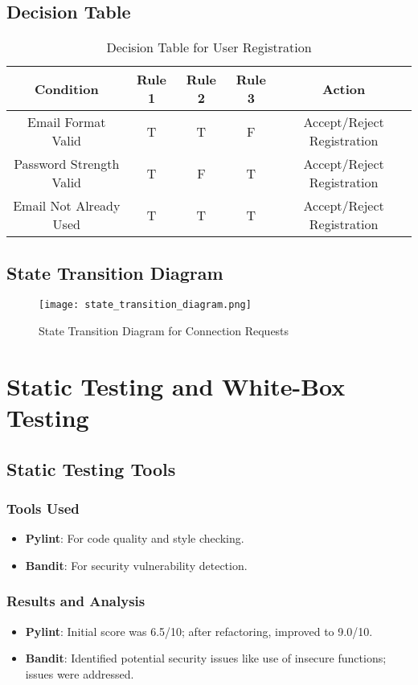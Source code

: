 \documentclass[12pt,a4paper]{report}
\begin{document}
\section{Decision Table}
\begin{table}[H]
\centering
\begin{tabular}{cccc|c}
\toprule
\textbf{Condition} & \textbf{Rule 1} & \textbf{Rule 2} & \textbf{Rule 3} & \textbf{Action} \\
\midrule
Email Format Valid & T & T & F & Accept/Reject Registration \\
Password Strength Valid & T & F & T & Accept/Reject Registration \\
Email Not Already Used & T & T & T & Accept/Reject Registration \\
\bottomrule
\end{tabular}
\caption{Decision Table for User Registration}
\end{table}

\section{State Transition Diagram}
\begin{figure}[H]
\centering
\texttt{[image: state\_transition\_diagram.png]}
\caption{State Transition Diagram for Connection Requests}
\end{figure}

\chapter{Static Testing and White-Box Testing}
\section{Static Testing Tools}
\subsection{Tools Used}
\begin{itemize}
    \item \textbf{Pylint}: For code quality and style checking.
    \item \textbf{Bandit}: For security vulnerability detection.
\end{itemize}

\subsection{Results and Analysis}
\begin{itemize}
    \item \textbf{Pylint}: Initial score was 6.5/10; after refactoring, improved to 9.0/10.
    \item \textbf{Bandit}: Identified potential security issues like use of insecure functions; issues were addressed.
\end{itemize}
\end{document}
